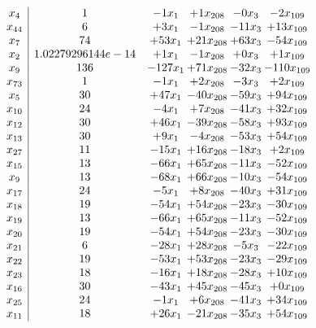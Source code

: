 \documentclass[11pt]{article}
\begin{document}
\[\begin{array}{c| c c@{\hskip 2pt} c@{\hskip 2pt} c@{\hskip 2pt} c@{\hskip 2pt} }
 x_{4}   &  1 & -1 x_{1} & + 1 x_{208} & -0 x_{3} & -2 x_{109}\\
 x_{44}   &  6 & + 3 x_{1} & -1 x_{208} & -11 x_{3} & + 13 x_{109}\\
 x_{7}   &  74 & + 53 x_{1} & + 21 x_{208} & + 63 x_{3} & -54 x_{109}\\
 x_{2}   &  1.02279296144e-14 & + 1 x_{1} & -1 x_{208} & + 0 x_{3} & + 1 x_{109}\\
 x_{9}   &  136 & -127 x_{1} & + 71 x_{208} & -32 x_{3} & -110 x_{109}\\
 x_{73}   &  1 & -1 x_{1} & + 2 x_{208} & -3 x_{3} & + 2 x_{109}\\
 x_{5}   &  30 & + 47 x_{1} & -40 x_{208} & -59 x_{3} & + 94 x_{109}\\
 x_{10}   &  24 & -4 x_{1} & + 7 x_{208} & -41 x_{3} & + 32 x_{109}\\
 x_{12}   &  30 & + 46 x_{1} & -39 x_{208} & -58 x_{3} & + 93 x_{109}\\
 x_{13}   &  30 & + 9 x_{1} & -4 x_{208} & -53 x_{3} & + 54 x_{109}\\
 x_{27}   &  11 & -15 x_{1} & + 16 x_{208} & -18 x_{3} & + 2 x_{109}\\
 x_{15}   &  13 & -66 x_{1} & + 65 x_{208} & -11 x_{3} & -52 x_{109}\\
 x_{9}   &  13 & -68 x_{1} & + 66 x_{208} & -10 x_{3} & -54 x_{109}\\
 x_{17}   &  24 & -5 x_{1} & + 8 x_{208} & -40 x_{3} & + 31 x_{109}\\
 x_{18}   &  19 & -54 x_{1} & + 54 x_{208} & -23 x_{3} & -30 x_{109}\\
 x_{19}   &  13 & -66 x_{1} & + 65 x_{208} & -11 x_{3} & -52 x_{109}\\
 x_{20}   &  19 & -54 x_{1} & + 54 x_{208} & -23 x_{3} & -30 x_{109}\\
 x_{21}   &  6 & -28 x_{1} & + 28 x_{208} & -5 x_{3} & -22 x_{109}\\
 x_{22}   &  19 & -53 x_{1} & + 53 x_{208} & -23 x_{3} & -29 x_{109}\\
 x_{23}   &  18 & -16 x_{1} & + 18 x_{208} & -28 x_{3} & + 10 x_{109}\\
 x_{16}   &  30 & -43 x_{1} & + 45 x_{208} & -45 x_{3} & + 0 x_{109}\\
 x_{25}   &  24 & -1 x_{1} & + 6 x_{208} & -41 x_{3} & + 34 x_{109}\\
 x_{11}   &  18 & + 26 x_{1} & -21 x_{208} & -35 x_{3} & + 54 x_{109}\\

\end{array}\]
\end{document}
